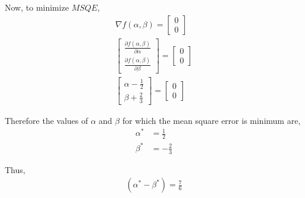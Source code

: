 \documentclass[]{article}
\begin{document}
Now, to minimize $MSQE$,
\begin{align}
    \nabla f(\alpha, \beta) = 
    \begin{bmatrix}
        0\\
        0
    \end{bmatrix} \\
    \begin{bmatrix}
        \frac{\partial f(\alpha, \beta)}{\partial \alpha}\\
        \frac{\partial f(\alpha, \beta)}{\partial \beta}
    \end{bmatrix} = 
    \begin{bmatrix}
        0\\
        0
    \end{bmatrix} \\
    \begin{bmatrix}
        \alpha - \frac{1}{2}\\
        \beta + \frac{2}{3}
    \end{bmatrix} = 
    \begin{bmatrix}
        0\\
        0
    \end{bmatrix}
\end{align}

Therefore the values of $\alpha$ and $\beta$ for which the mean square error is minimum are,
\begin{align}
    \alpha ^* &= \frac{1}{2} \\
    \beta ^* &= -\frac{2}{3}
\end{align}

Thus, 
\begin{align}
    (\alpha ^* - \beta ^*) = \frac{7}{6}
\end{align}
\end{document}
